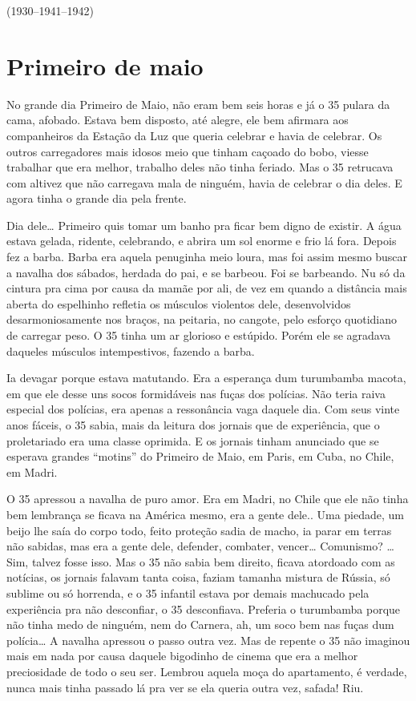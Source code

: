 \bigskip

\hfill{}(1930--1941--1942)

\chapter{Primeiro de maio}

No grande dia Primeiro de Maio, não eram bem seis horas e já o 35 pulara
da cama, afobado. Estava bem disposto, até alegre, ele bem afirmara aos
companheiros da Estação da Luz que queria celebrar e havia de celebrar.
Os outros carregadores mais idosos meio que tinham caçoado do bobo,
viesse trabalhar que era melhor, trabalho deles não tinha feriado. Mas o
35 retrucava com altivez que não carregava mala de ninguém, havia de
celebrar o dia deles. E agora tinha o grande dia pela frente.

Dia dele\ldots{} Primeiro quis tomar um banho pra ficar bem digno de existir.
A água estava gelada, ridente, celebrando, e abrira um sol enorme e frio
lá fora. Depois fez a barba. Barba era aquela penuginha meio loura, mas
foi assim mesmo buscar a navalha dos sábados, herdada do pai, e se
barbeou. Foi se barbeando. Nu só da cintura pra cima por causa da mamãe
por ali, de vez em quando a distância mais aberta do espelhinho refletia
os músculos violentos dele, desenvolvidos desarmoniosamente nos braços,
na peitaria, no cangote, pelo esforço quotidiano de carregar peso. O 35
tinha um ar glorioso e estúpido. Porém ele se agradava daqueles músculos
intempestivos, fazendo a barba.

Ia devagar porque estava matutando. Era a esperança dum turumbamba
macota, em que ele desse uns socos formidáveis nas fuças dos polícias.
Não teria raiva especial dos polícias, era apenas a ressonância vaga
daquele dia. Com seus vinte anos fáceis, o 35 sabia, mais da leitura dos
jornais que de experiência, que o proletariado era uma classe oprimida.
E os jornais tinham anunciado que se esperava grandes ``motins'' do
Primeiro de Maio, em Paris, em Cuba, no Chile, em Madri.

O 35 apressou a navalha de puro amor. Era em Madri, no Chile que ele não
tinha bem lembrança se ficava na América mesmo, era a gente dele.. Uma
piedade, um beijo lhe saía do corpo todo, feito proteção sadia de macho,
ia parar em terras não sabidas, mas era a gente dele, defender,
combater, vencer\ldots{} Comunismo? \ldots{} Sim, talvez fosse isso. Mas o 35 não
sabia bem direito, ficava atordoado com as notícias, os jornais falavam
tanta coisa, faziam tamanha mistura de Rússia, só sublime ou só
horrenda, e o 35 infantil estava por demais machucado pela experiência
pra não desconfiar, o 35 desconfiava. Preferia o turumbamba porque não
tinha medo de ninguém, nem do Carnera, ah, um soco bem nas fuças dum
polícia\ldots{} A navalha apressou o passo outra vez. Mas de repente o 35 não
imaginou mais em nada por causa daquele bigodinho de cinema que era a
melhor preciosidade de todo o seu ser. Lembrou aquela moça do
apartamento, é verdade, nunca mais tinha passado lá pra ver se ela
queria outra vez, safada! Riu.

